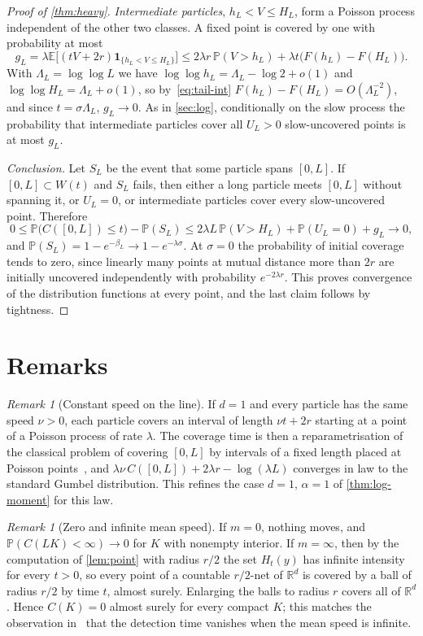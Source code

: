 \documentclass[11pt,a4paper]{article}
\numberwithin{equation}{section}
\theoremstyle{definition}
\theoremstyle{remark}
\newtheorem{remark}[theorem]{Remark}
\newcommand{\E}{\mathbb E}
\newcommand{\Pp}{\mathbb P}
\newcommand{\R}{\mathbb R}
\newcommand{\ind}{\mathbf 1}
\begin{document}
\begin{proof}[Proof of \cref{thm:heavy}]
\emph{Intermediate particles}, $h_L<V\le H_L$, form a Poisson process
independent of the other two classes. A fixed point is covered by one with
probability at most
\[
g_L=\lambda\E\bigl[(tV+2r)\ind_{\{h_L<V\le H_L\}}\bigr]
\le2\lambda r\,\Pp(V>h_L)+\lambda t\bigl(F(h_L)-F(H_L)\bigr).
\]
With $\Lambda_L=\log\log L$ we have $\log\log h_L=\Lambda_L-\log2+o(1)$ and
$\log\log H_L=\Lambda_L+o(1)$, so by~\eqref{eq:tail-int}
$F(h_L)-F(H_L)=O(\Lambda_L^{-2})$, and since $t=\sigma\Lambda_L$, $g_L\to0$. As
in \cref{sec:log}, conditionally on the slow process the probability that
intermediate particles cover all $U_L>0$ slow-uncovered points is at most
$g_L$.

\emph{Conclusion.} Let $S_L$ be the event that some particle spans $[0,L]$. If
$[0,L]\subset W(t)$ and $S_L$ fails, then either a long particle meets $[0,L]$
without spanning it, or $U_L=0$, or intermediate particles cover every
slow-uncovered point. Therefore
\[
0\le\Pp\bigl(C([0,L])\le t\bigr)-\Pp(S_L)\le2\lambda L\,\Pp(V>H_L)+\Pp(U_L=0)+g_L\to0,
\]
and $\Pp(S_L)=1-e^{-\beta_L}\to1-e^{-\lambda\sigma}$. At $\sigma=0$ the
probability of initial coverage tends to zero, since linearly many points at
mutual distance more than $2r$ are initially uncovered independently with
probability $e^{-2\lambda r}$. This proves convergence of the distribution
functions at every point, and the last claim follows by tightness.
\end{proof}

\section{Remarks}\label{sec:remarks}

\begin{remark}[Constant speed on the line]\label{rem:gumbel}
If $d=1$ and every particle has the same speed $\nu>0$, each particle covers an
interval of length $\nu t+2r$ starting at a point of a Poisson process of rate
$\lambda$. The coverage time is then a reparametrisation of the classical
problem of covering $[0,L]$ by intervals of a fixed length placed at Poisson
points~\cite{Jan86,Hal88}, and
$\lambda\nu\,C([0,L])+2\lambda r-\log(\lambda L)$ converges in law to the
standard Gumbel distribution. This refines the case $d=1$, $\alpha=1$ of
\cref{thm:log-moment} for this law.
\end{remark}

\begin{remark}[Zero and infinite mean speed]\label{rem:extreme}
If $m=0$, nothing moves, and $\Pp(C(LK)<\infty)\to0$ for $K$ with nonempty
interior. If $m=\infty$, then by the computation of \cref{lem:point} with
radius $r/2$ the set $H_t(y)$ has infinite intensity for every $t>0$, so every
point of a countable $r/2$-net of $\R^d$ is covered by a ball of radius $r/2$
by time $t$, almost surely. Enlarging the balls to radius $r$ covers all of
$\R^d$. Hence $C(K)=0$ almost surely for every compact $K$; this matches the
observation in~\cite{Kon14} that the detection time vanishes when the mean
speed is infinite.
\end{remark}
\end{document}
